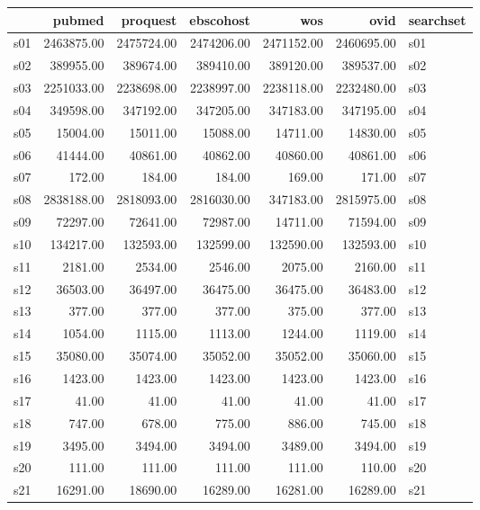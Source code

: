 \begin{table}[ht]
\centering
\begin{tabular}{rrrrrrl}
  \hline
 & pubmed & proquest & ebscohost & wos & ovid & searchset \\ 
  \hline
s01 & 2463875.00 & 2475724.00 & 2474206.00 & 2471152.00 & 2460695.00 & s01 \\ 
  s02 & 389955.00 & 389674.00 & 389410.00 & 389120.00 & 389537.00 & s02 \\ 
  s03 & 2251033.00 & 2238698.00 & 2238997.00 & 2238118.00 & 2232480.00 & s03 \\ 
  s04 & 349598.00 & 347192.00 & 347205.00 & 347183.00 & 347195.00 & s04 \\ 
  s05 & 15004.00 & 15011.00 & 15088.00 & 14711.00 & 14830.00 & s05 \\ 
  s06 & 41444.00 & 40861.00 & 40862.00 & 40860.00 & 40861.00 & s06 \\ 
  s07 & 172.00 & 184.00 & 184.00 & 169.00 & 171.00 & s07 \\ 
  s08 & 2838188.00 & 2818093.00 & 2816030.00 & 347183.00 & 2815975.00 & s08 \\ 
  s09 & 72297.00 & 72641.00 & 72987.00 & 14711.00 & 71594.00 & s09 \\ 
  s10 & 134217.00 & 132593.00 & 132599.00 & 132590.00 & 132593.00 & s10 \\ 
  s11 & 2181.00 & 2534.00 & 2546.00 & 2075.00 & 2160.00 & s11 \\ 
  s12 & 36503.00 & 36497.00 & 36475.00 & 36475.00 & 36483.00 & s12 \\ 
  s13 & 377.00 & 377.00 & 377.00 & 375.00 & 377.00 & s13 \\ 
  s14 & 1054.00 & 1115.00 & 1113.00 & 1244.00 & 1119.00 & s14 \\ 
  s15 & 35080.00 & 35074.00 & 35052.00 & 35052.00 & 35060.00 & s15 \\ 
  s16 & 1423.00 & 1423.00 & 1423.00 & 1423.00 & 1423.00 & s16 \\ 
  s17 & 41.00 & 41.00 & 41.00 & 41.00 & 41.00 & s17 \\ 
  s18 & 747.00 & 678.00 & 775.00 & 886.00 & 745.00 & s18 \\ 
  s19 & 3495.00 & 3494.00 & 3494.00 & 3489.00 & 3494.00 & s19 \\ 
  s20 & 111.00 & 111.00 & 111.00 & 111.00 & 110.00 & s20 \\ 
  s21 & 16291.00 & 18690.00 & 16289.00 & 16281.00 & 16289.00 & s21 \\ 

\end{tabular}
\end{table}
